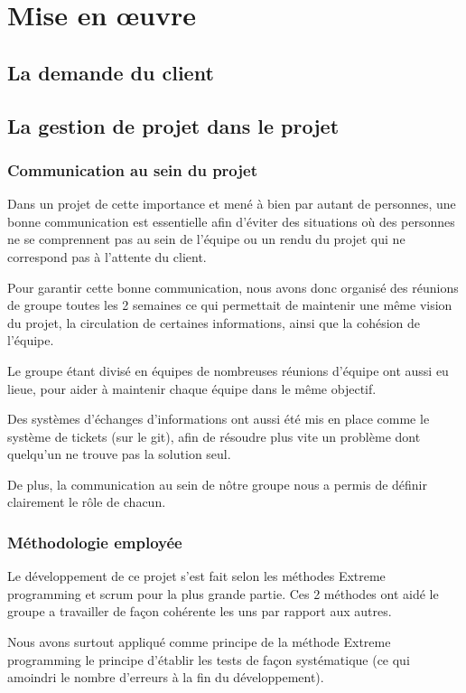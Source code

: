 \chapter{Mise en œuvre}
\section{La demande du client}

\section{La gestion de projet dans le projet}

\subsection{Communication au sein du projet}

Dans un projet de cette importance et mené à bien par autant de personnes, une bonne communication est essentielle afin d'éviter des situations où des personnes ne se comprennent pas au sein de l'équipe ou un rendu du projet qui ne correspond pas à l'attente du client.

Pour garantir cette bonne communication, nous avons donc organisé des réunions de groupe toutes les 2 semaines ce qui permettait de maintenir une même vision du projet, la circulation de certaines informations, ainsi que la cohésion de l'équipe.

Le groupe étant divisé en équipes de nombreuses réunions d'équipe ont aussi eu lieue, pour aider à maintenir chaque équipe dans le même objectif.

Des systèmes d'échanges d'informations ont aussi été mis en place comme le système de tickets (sur le git), afin de résoudre plus vite un problème dont quelqu'un ne trouve pas la solution seul.

De plus, la communication au sein de nôtre groupe nous a permis de définir clairement le rôle de chacun.

\subsection{Méthodologie employée}

Le développement de ce projet s'est fait selon les méthodes Extreme programming et scrum pour la plus grande partie. Ces 2 méthodes ont aidé le groupe a travailler de façon cohérente les uns par rapport aux autres.

Nous avons surtout appliqué comme principe de la méthode Extreme programming le principe d'établir les tests de façon systématique (ce qui amoindri le nombre d'erreurs à la fin du développement).

